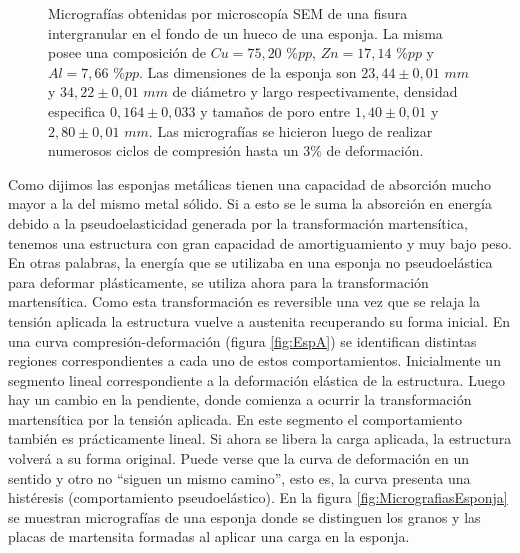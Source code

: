 \documentclass[a4paper,12pt,fleqn,twoside,openany]{book}
\begin{document}
\begin{figure}[h]
\begin{subfigure}{0.45\textwidth}
        \caption{}
        \label{fig:EspAa}
    \end{subfigure}
  \caption{Micrografías obtenidas por microscopía SEM de una fisura intergranular en el fondo de un hueco de una esponja. La misma posee una composición de $Cu=75,20$ $\%pp$, $Zn=17,14$ $\%pp$ y $Al=7,66$ $\%pp$. Las dimensiones de la esponja son $23,44 \pm0,01$ $mm$ y $34,22 \pm0,01$ $mm$ de diámetro y largo respectivamente, densidad especifica $0,164 \pm 0,033$ y tamaños de poro entre $1,40 \pm 0,01$ y $2,80 \pm 0,01$ $mm$. Las micrografías se hicieron luego de realizar numerosos ciclos de compresión hasta un $3\%$ de deformación.}
  \label{fig:FisuraEsponja}
  \end{figure}

Como dijimos las esponjas metálicas tienen una capacidad de absorción mucho mayor a la del mismo metal sólido. Si a esto se le suma la absorción en energía 
debido a la pseudoelasticidad generada por la transformación martensítica, tenemos una estructura con gran capacidad de amortiguamiento y muy bajo 
peso. En otras palabras, la energía que se utilizaba en una esponja no pseudoelástica para deformar plásticamente, se utiliza ahora para la transformación
martensítica. Como esta transformación es reversible una vez que se relaja la tensión aplicada la estructura vuelve a austenita recuperando su forma 
inicial. En una curva compresión-deformación (figura \ref{fig:EspA}) se identifican distintas regiones correspondientes a cada uno de estos comportamientos. Inicialmente un 
segmento lineal correspondiente a la deformación elástica de la estructura. Luego hay un cambio en la pendiente, donde comienza a ocurrir 
la transformación martensítica por la tensión aplicada. En este segmento el comportamiento también es prácticamente lineal. Si ahora se libera la carga 
aplicada, la estructura volverá a su forma original. Puede verse que la curva de deformación en un sentido y otro no “siguen un mismo camino”, esto es, 
la curva presenta una histéresis (comportamiento pseudoelástico). En la figura \ref{fig:MicrografiasEsponja} se muestran micrografías de una esponja donde se distinguen los granos y las placas de martensita formadas al aplicar una carga en la esponja.
\end{document}
